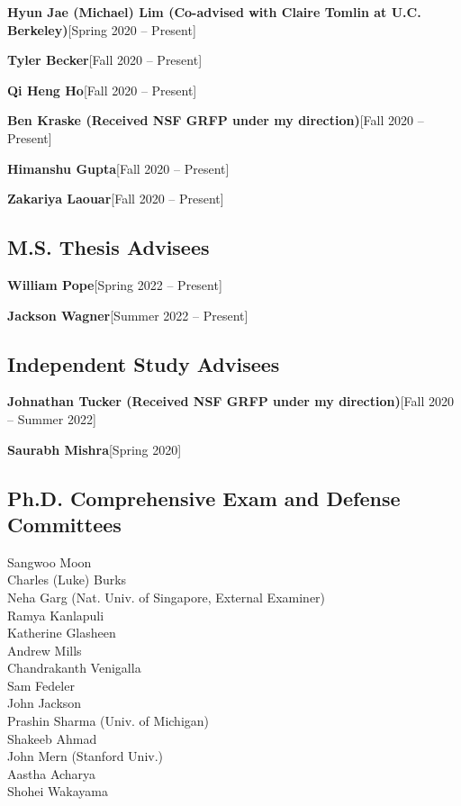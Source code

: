 \documentclass[10pt,roman]{moderncv}
\newcommand{\mycvitem}[2]{
    \textbf{#2}\hfill [#1]\break
}
\begin{document}
\mycvitem{Spring 2020 -- Present}{Hyun Jae (Michael) Lim {\normalfont(Co-advised with Claire Tomlin at U.C. Berkeley)}}
\mycvitem{Fall 2020 -- Present}{Tyler Becker}
\mycvitem{Fall 2020 -- Present}{Qi Heng Ho}
\mycvitem{Fall 2020 -- Present}{Ben Kraske {\normalfont(Received NSF GRFP under my direction)}}
\mycvitem{Fall 2020 -- Present}{Himanshu Gupta}
\mycvitem{Fall 2020 -- Present}{Zakariya Laouar}

\subsection{M.S. Thesis Advisees}
\mycvitem{Spring 2022 -- Present}{William Pope}
\mycvitem{Summer 2022 -- Present}{Jackson Wagner}

\subsection{Independent Study Advisees}
\mycvitem{Fall 2020 -- Summer 2022}{Johnathan Tucker {\normalfont(Received NSF GRFP under my direction)}}
\mycvitem{Spring 2020}{Saurabh Mishra}

\begin{minipage}{\textwidth}
\subsection{Ph.D. Comprehensive Exam and Defense Committees}
\begin{multicols}{2}
    \small
    Sangwoo Moon\\
    Charles (Luke) Burks\\
    Neha Garg (Nat. Univ. of Singapore, External Examiner)\\
    Ramya Kanlapuli\\
    Katherine Glasheen\\
    Andrew Mills\\
    Chandrakanth Venigalla\\
    Sam Fedeler\\
    John Jackson\\
    Prashin Sharma (Univ. of Michigan)\\
    Shakeeb Ahmad\\
    John Mern (Stanford Univ.)\\
    Aastha Acharya\\
    Shohei Wakayama
\end{multicols}
\end{minipage}\\
\\
\end{document}

